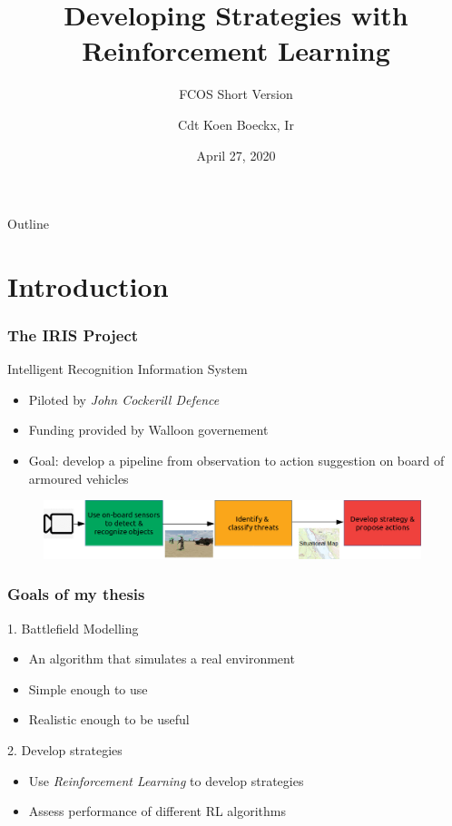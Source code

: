 \documentclass{beamer}
\title{Developing Strategies with Reinforcement Learning}
\subtitle{FCOS Short Version}
\author{Cdt Koen Boeckx, Ir}
\date{April 27, 2020}
\begin{document}

\begin{frame}
\titlepage
\end{frame}

\begin{frame}{Outline}
\tableofcontents
\end{frame}

\section{Introduction}

\begin{frame}
\frametitle{The IRIS Project}
\begin{block}{Intelligent Recognition Information System}
\begin{itemize}
    \item Piloted by \emph{John Cockerill Defence}
    \item Funding provided by Walloon governement
    \item Goal: develop a pipeline from observation to action suggestion on board of armoured vehicles
\end{itemize}
\end{block}
\begin{figure}[htp]
    \centering
    \includegraphics[width=11cm]{images/IRIS_schematic.png}
\end{figure}
\end{frame}

\begin{frame}
\frametitle{Goals of my thesis}
\begin{block}{1. Battlefield Modelling}
\begin{itemize}
    \item An algorithm that simulates a real environment
    \item \alert{Simple} enough to use
    \item Realistic enough to be useful
\end{itemize}
\end{block}
\pause
\begin{block}{2. Develop strategies}
\begin{itemize}
    \item Use \emph{Reinforcement Learning} to develop strategies
    \item Assess performance of different RL algorithms
\end{itemize}
\end{block}
\end{frame}
\end{document}
